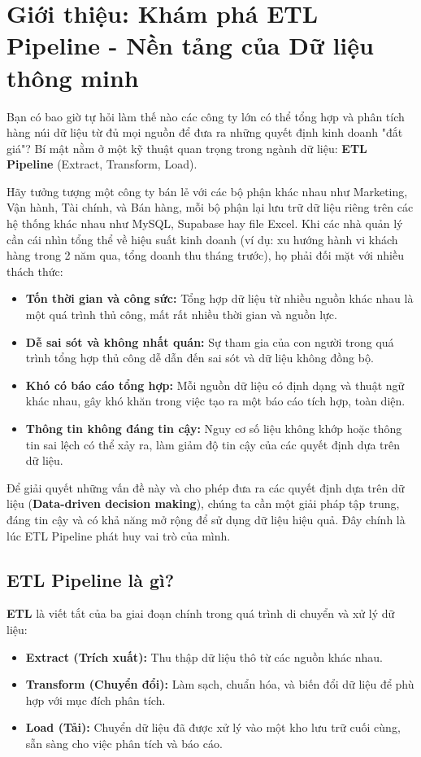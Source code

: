 \section{Giới thiệu: Khám phá ETL Pipeline - Nền tảng của Dữ liệu thông minh}

Bạn có bao giờ tự hỏi làm thế nào các công ty lớn có thể tổng hợp và phân tích hàng núi dữ liệu từ đủ mọi nguồn để đưa ra những quyết định kinh doanh "đắt giá"? Bí mật nằm ở một kỹ thuật quan trọng trong ngành dữ liệu: \textbf{ETL Pipeline} (Extract, Transform, Load).

Hãy tưởng tượng một công ty bán lẻ với các bộ phận khác nhau như Marketing, Vận hành, Tài chính, và Bán hàng, mỗi bộ phận lại lưu trữ dữ liệu riêng trên các hệ thống khác nhau như MySQL, Supabase hay file Excel. Khi các nhà quản lý cần cái nhìn tổng thể về hiệu suất kinh doanh (ví dụ: xu hướng hành vi khách hàng trong 2 năm qua, tổng doanh thu tháng trước), họ phải đối mặt với nhiều thách thức:
\begin{itemize}
    \item \textbf{Tốn thời gian và công sức:} Tổng hợp dữ liệu từ nhiều nguồn khác nhau là một quá trình thủ công, mất rất nhiều thời gian và nguồn lực.
    \item \textbf{Dễ sai sót và không nhất quán:} Sự tham gia của con người trong quá trình tổng hợp thủ công dễ dẫn đến sai sót và dữ liệu không đồng bộ.
    \item \textbf{Khó có báo cáo tổng hợp:} Mỗi nguồn dữ liệu có định dạng và thuật ngữ khác nhau, gây khó khăn trong việc tạo ra một báo cáo tích hợp, toàn diện.
    \item \textbf{Thông tin không đáng tin cậy:} Nguy cơ số liệu không khớp hoặc thông tin sai lệch có thể xảy ra, làm giảm độ tin cậy của các quyết định dựa trên dữ liệu.
\end{itemize}

Để giải quyết những vấn đề này và cho phép đưa ra các quyết định dựa trên dữ liệu (\textbf{Data-driven decision making}), chúng ta cần một giải pháp tập trung, đáng tin cậy và có khả năng mở rộng để sử dụng dữ liệu hiệu quả. Đây chính là lúc ETL Pipeline phát huy vai trò của mình.

\subsection{ETL Pipeline là gì?}

\textbf{ETL} là viết tắt của ba giai đoạn chính trong quá trình di chuyển và xử lý dữ liệu:
\begin{itemize}
    \item \textbf{Extract (Trích xuất):} Thu thập dữ liệu thô từ các nguồn khác nhau.
    \item \textbf{Transform (Chuyển đổi):} Làm sạch, chuẩn hóa, và biến đổi dữ liệu để phù hợp với mục đích phân tích.
    \item \textbf{Load (Tải):} Chuyển dữ liệu đã được xử lý vào một kho lưu trữ cuối cùng, sẵn sàng cho việc phân tích và báo cáo.
\end{itemize}

